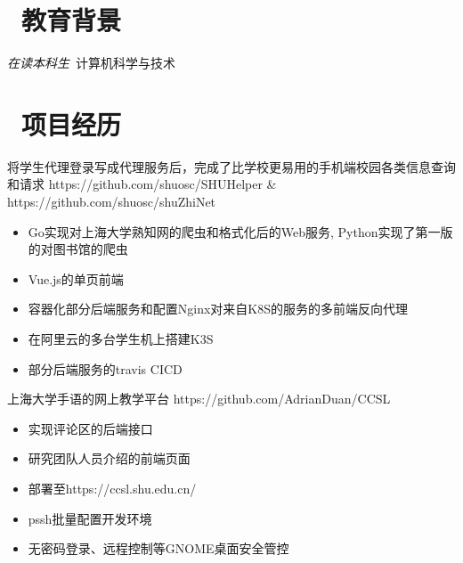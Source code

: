 \documentclass{resume}
\begin{document}



\section{\faGraduationCap\  教育背景}
\textit{在读本科生}\ 计算机科学与技术

\section{\faUsers\ 项目经历}
\begin{onehalfspacing}
将学生代理登录写成代理服务后，完成了比学校更易用的手机端校园各类信息查询和请求 \newline
https://github.com/shuosc/SHUHelper \&
https://github.com/shuosc/shuZhiNet
\begin{itemize}
  \item Go实现对上海大学熟知网的爬虫和格式化后的Web服务, Python实现了第一版的对图书馆的爬虫
  \item Vue.js的单页前端
  \item 容器化部分后端服务和配置Nginx对来自K8S的服务的多前端反向代理
  \item 在阿里云的多台学生机上搭建K3S
  \item 部分后端服务的travis CICD
\end{itemize}
\end{onehalfspacing}

上海大学手语的网上教学平台 https://github.com/AdrianDuan/CCSL
\begin{itemize}
  \item 实现评论区的后端接口
  \item 研究团队人员介绍的前端页面
  \item 部署至https://ccsl.shu.edu.cn/
\end{itemize}

\begin{onehalfspacing}
\begin{itemize}
  \item pssh批量配置开发环境
  \item 无密码登录、远程控制等GNOME桌面安全管控
\end{itemize}
\end{onehalfspacing}
\end{document}
